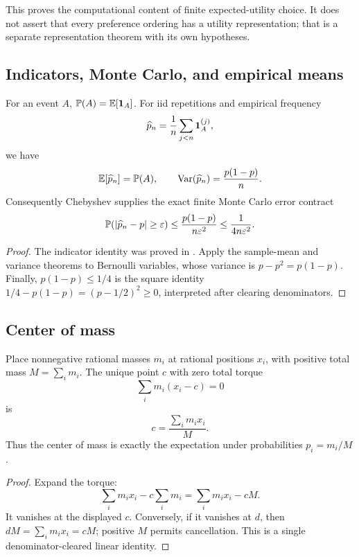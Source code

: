 \begin{remark}
This proves the computational content of finite expected-utility choice.  It
does not assert that every preference ordering has a utility representation;
that is a separate representation theorem with its own hypotheses.
\end{remark}

\subsection{Indicators, Monte Carlo, and empirical means}

\begin{theorem}
\label{thm:monte-carlo}
For an event \(A\), \(\mathbb P(A)=\mathbb E[\mathbf 1_A]\).  For iid repetitions and empirical
frequency
\[
 \widehat p_n=\frac1n\sum_{j<n}\mathbf 1_A^{(j)},
\]
we have
\[
 \mathbb E[\widehat p_n]=\mathbb P(A),\qquad
 \operatorname{Var}(\widehat p_n)=\frac{p(1-p)}n.
\]
Consequently Chebyshev supplies the exact finite Monte Carlo error contract
\[
 \mathbb P(\lvert \widehat p_n-p\rvert\ge\varepsilon)
 \le\frac{p(1-p)}{n\varepsilon^2}
 \le\frac1{4n\varepsilon^2}.
\]
\end{theorem}

\begin{proof}
The indicator identity was proved in .  Apply the
sample-mean and variance theorems to Bernoulli variables, whose variance is
\(p-p^2=p(1-p)\).  Finally,
\(p(1-p)\le1/4\) is the square identity
\(1/4-p(1-p)=(p-1/2)^2\ge0\), interpreted after clearing denominators.
\end{proof}

\subsection{Center of mass}

\begin{theorem}\label{thm:center-mass}
Place nonnegative rational masses \(m_i\) at rational positions \(x_i\), with
positive total mass \(M=\sum_i m_i\).  The unique point \(c\) with zero total
torque
\[
 \sum_i m_i(x_i-c)=0
\]
is
\[
 c=\frac{\sum_i m_ix_i}{M}.
\]
Thus the center of mass is exactly the expectation under probabilities
\(p_i=m_i/M\).
\end{theorem}

\begin{proof}
Expand the torque:
\[
 \sum_i m_ix_i-c\sum_i m_i=\sum_i m_ix_i-cM.
\]
It vanishes at the displayed \(c\).  Conversely, if it vanishes at \(d\), then
\(dM=\sum_i m_ix_i=cM\); positive \(M\) permits cancellation.  This is a
single denominator-cleared linear identity.
\end{proof}

